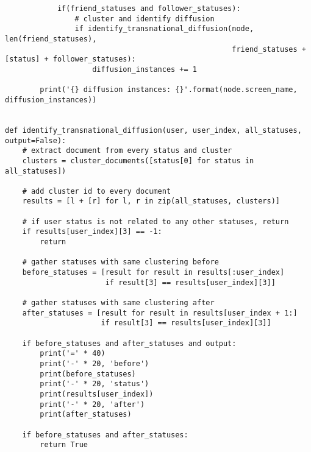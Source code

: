 \begin{lstlisting}
            if(friend_statuses and follower_statuses):
                # cluster and identify diffusion
                if identify_transnational_diffusion(node, len(friend_statuses),
                                                    friend_statuses + [status] + follower_statuses):
                    diffusion_instances += 1
        
        print('{} diffusion instances: {}'.format(node.screen_name, diffusion_instances))


def identify_transnational_diffusion(user, user_index, all_statuses, output=False):
    # extract document from every status and cluster
    clusters = cluster_documents([status[0] for status in all_statuses])
    
    # add cluster id to every document
    results = [l + [r] for l, r in zip(all_statuses, clusters)]
    
    # if user status is not related to any other statuses, return
    if results[user_index][3] == -1:
        return
    
    # gather statuses with same clustering before
    before_statuses = [result for result in results[:user_index]
                       if result[3] == results[user_index][3]]
    
    # gather statuses with same clustering after
    after_statuses = [result for result in results[user_index + 1:]
                      if result[3] == results[user_index][3]]
    
    if before_statuses and after_statuses and output:
        print('=' * 40)
        print('-' * 20, 'before')
        print(before_statuses)
        print('-' * 20, 'status')
        print(results[user_index])
        print('-' * 20, 'after')
        print(after_statuses)
    
    if before_statuses and after_statuses:
        return True
\end{lstlisting}
